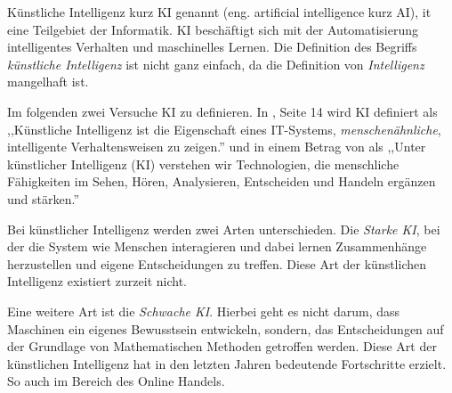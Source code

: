Künstliche Intelligenz kurz KI genannt (eng. artificial intelligence kurz AI), it eine Teilgebiet der Informatik. KI beschäftigt sich mit der Automatisierung intelligentes Verhalten und maschinelles Lernen. Die Definition des Begriffs \textit{künstliche Intelligenz} ist nicht ganz einfach, da die Definition von \textit{Intelligenz} mangelhaft ist.\vspace{0.2cm}

Im folgenden zwei Versuche KI zu definieren. In \cite{def_ai_weber}, Seite 14 wird KI definiert als ,,Künstliche Intelligenz ist die Eigenschaft eines IT-Systems, \textit{menschenähnliche}, intelligente Verhaltensweisen zu zeigen.'' und in einem Betrag von \cite{def_ai_ronsdorf} als ,,Unter künstlicher Intelligenz (KI) verstehen wir Technologien, die menschliche Fähigkeiten im Sehen, Hören, Analysieren, Entscheiden und Handeln ergänzen und stärken.''\vspace{0.2cm}

Bei künstlicher Intelligenz werden zwei Arten unterschieden. Die \textit{Starke KI}, bei der die System wie Menschen interagieren und dabei lernen Zusammenhänge herzustellen und eigene Entscheidungen zu treffen. Diese Art der künstlichen Intelligenz existiert zurzeit nicht.\vspace{0.2cm}

Eine weitere Art ist die \textit{Schwache KI}. Hierbei geht es nicht darum, dass Maschinen ein eigenes Bewusstsein entwickeln, sondern, das Entscheidungen auf der Grundlage von Mathematischen Methoden getroffen werden. Diese Art der künstlichen Intelligenz hat in den letzten Jahren bedeutende Fortschritte erzielt. So auch im Bereich des Online Handels.